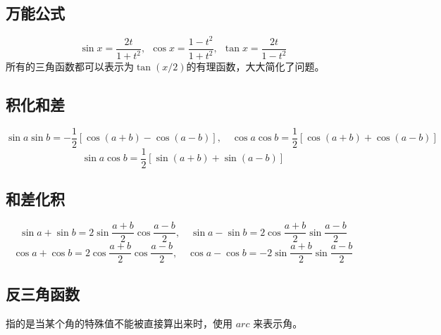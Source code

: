 \subsection{万能公式}
\begin{theorem}
    $$\sin x = \frac{2t}{1+t^2},\ \ \cos x = \frac{1-t^2}{1+t^2},\ \ \tan x = \frac{2t}{1-t^2}$$
    所有的三角函数都可以表示为$\tan(x/2)$的有理函数，大大简化了问题。
\end{theorem}

\subsection{积化和差}
\begin{theorem}[积化和差公式]
    $$\sin a\sin b = -\frac{1}{2}\left[\cos(a+b)-\cos(a-b)\right], \quad
        \cos a\cos b = \frac{1}{2}\left[\cos(a+b)+\cos(a-b)\right]$$
    $$\sin a\cos b = \frac{1}{2}\left[\sin(a+b)+\sin(a-b)\right]$$
\end{theorem}

\subsection{和差化积}
\begin{theorem}[和差化积公式]
    $$\sin a+\sin b = 2\sin \frac{a+b}{2}\cos \frac{a-b}{2}, \quad
        \sin a-\sin b = 2\cos \frac{a+b}{2}\sin \frac{a-b}{2}$$
    $$\cos a+ \cos b = 2\cos \frac{a+b}{2}\cos \frac{a-b}{2}, \quad
        \cos a- \cos b = -2\sin \frac{a+b}{2}\sin \frac{a-b}{2}$$
\end{theorem}

\subsection{反三角函数}

\begin{definition}[反三角表示法]
    指的是当某个角的特殊值不能被直接算出来时，使用 $arc$ 来表示角。
\end{definition}